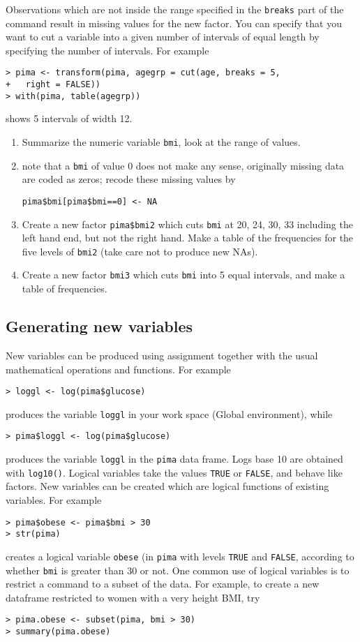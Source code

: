 \documentclass[12pt]{article}
\begin{document}
Observations which are not inside the range specified in the \texttt{breaks} part of the command result in missing values for the new factor. You can specify that you want to cut a variable into a
given number of intervals of equal length by specifying the number of intervals. For example
\begin{verbatim}
> pima <- transform(pima, agegrp = cut(age, breaks = 5,
+   right = FALSE))
> with(pima, table(agegrp))
\end{verbatim}
shows 5 intervals of width 12.
\begin{enumerate}
\item Summarize the numeric variable \texttt{bmi}, look at the range of values.
\item note that a \texttt{bmi} of value 0 does not make any sense, originally missing data are coded as zeros; recode these missing values by 
\begin{verbatim}
pima$bmi[pima$bmi==0] <- NA
\end{verbatim}
\item Create a new factor \texttt{pima\$bmi2} which cuts \texttt{bmi} at 20, 24, 30, 33 including the left hand end, but not the right hand. Make a table of the frequencies for the five levels of \texttt{bmi2} (take care not to produce new NAs).
\item Create a new factor \texttt{bmi3} which cuts \texttt{bmi} into 5 equal intervals, and make a table of frequencies.
\end{enumerate}

\subsection{Generating new variables}
New variables can be produced using assignment together with the usual mathematical operations
and functions. For example
\begin{verbatim}
> loggl <- log(pima$glucose)
\end{verbatim}
produces the variable \texttt{loggl} in your work space (Global environment), while
\begin{verbatim}
> pima$loggl <- log(pima$glucose)
\end{verbatim}
produces the variable \texttt{loggl} in the \texttt{pima} data frame. Logs base 10 are obtained with \texttt{log10()}.
Logical variables take the values \texttt{TRUE} or \texttt{FALSE}, and behave like factors. New variables can be created which are logical functions of existing variables. For example
\begin{verbatim}
> pima$obese <- pima$bmi > 30
> str(pima)
\end{verbatim}
creates a logical variable \texttt{obese} (in \texttt{pima} with levels \texttt{TRUE} and \texttt{FALSE}, according to whether
\texttt{bmi} is greater than 30 or not. One common use of logical variables is to restrict a command to
a subset of the data. For example, to create a new dataframe restricted to women with a very height BMI, try
\begin{verbatim}
> pima.obese <- subset(pima, bmi > 30)
> summary(pima.obese)
\end{verbatim}
\end{document}
